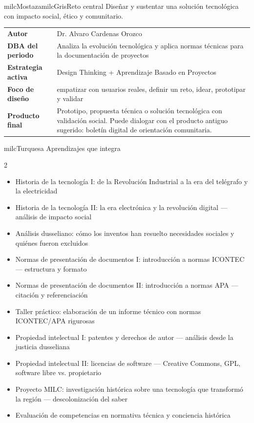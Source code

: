 \documentclass[11pt,letterpaper]{article}
\begin{document}
\begin{softbox}{milcMostaza}{milcGris}{Reto central}
Diseñar y sustentar una solución tecnológica con impacto social, ético y comunitario.
\end{softbox}

\begin{tabularx}{\textwidth}{>{\bfseries}p{3.4cm}X}
\rowcolor{milcMagenta!12}Autor & Dr. Alvaro Cardenas Orozco\\
DBA del periodo & Analiza la evolución tecnológica y aplica normas técnicas para la documentación de proyectos\\
Estrategia activa & Design Thinking + Aprendizaje Basado en Proyectos\\
Foco de diseño & empatizar con usuarios reales, definir un reto, idear, prototipar y validar\\
Producto final & Prototipo, propuesta técnica o solución tecnológica con validación social. Puede dialogar con el producto antiguo sugerido: boletín digital de orientación comunitaria.\\
\end{tabularx}

\begin{titlebox}{milcTurquesa}
Aprendizajes que integra
\end{titlebox}
\begin{multicols}{2}
\begin{itemize}[leftmargin=*]
\item Historia de la tecnología I: de la Revolución Industrial a la era del telégrafo y la electricidad
\item Historia de la tecnología II: la era electrónica y la revolución digital — análisis de impacto social
\item Análisis dusseliano: cómo los inventos han resuelto necesidades sociales y quiénes fueron excluidos
\item Normas de presentación de documentos I: introducción a normas ICONTEC — estructura y formato
\item Normas de presentación de documentos II: introducción a normas APA — citación y referenciación
\item Taller práctico: elaboración de un informe técnico con normas ICONTEC/APA rigurosas
\item Propiedad intelectual I: patentes y derechos de autor — análisis desde la justicia dusseliana
\item Propiedad intelectual II: licencias de software — Creative Commons, GPL, software libre vs. propietario
\item Proyecto MILC: investigación histórica sobre una tecnología que transformó la región — descolonización del saber
\item Evaluación de competencias en normativa técnica y conciencia histórica
\end{itemize}
\end{multicols}
\end{document}

